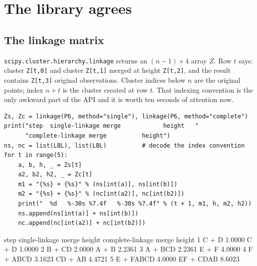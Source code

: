 \documentclass[11pt]{article}
\begin{document}
\section{The library agrees}
\label{sec:scipy}

\subsection{The linkage matrix}

\texttt{scipy.cluster.hierarchy.linkage} returns an $(n-1) \times 4$ array
$Z$. Row $t$ says: cluster \texttt{Z[t,0]} and cluster \texttt{Z[t,1]} merged
at height \texttt{Z[t,2]}, and the result contains \texttt{Z[t,3]} original
observations. Cluster indices below $n$ are the original points; index $n+t$
is the cluster created at row $t$. That indexing convention is the only
awkward part of the API and it is worth ten seconds of attention now.

\begin{lstlisting}
Zs, Zc = linkage(P6, method="single"), linkage(P6, method="complete")
print("step  single-linkage merge            height   "
      "complete-linkage merge          height")
ns, nc = list(LBL), list(LBL)          # decode the index convention
for t in range(5):
    a, b, h, _ = Zs[t]
    a2, b2, h2, _ = Zc[t]
    m1 = "{%s} + {%s}" % (ns[int(a)], ns[int(b)])
    m2 = "{%s} + {%s}" % (nc[int(a2)], nc[int(b2)])
    print("  %d   %-30s %7.4f   %-30s %7.4f" % (t + 1, m1, h, m2, h2))
    ns.append(ns[int(a)] + ns[int(b)])
    nc.append(nc[int(a2)] + nc[int(b2)])
\end{lstlisting}
\begin{codeout}
step  single-linkage merge            height   complete-linkage merge          height
  1   {C} + {D}                       1.0000   {C} + {D}                       1.0000
  2   {B} + {CD}                      2.0000   {A} + {B}                       2.2361
  3   {A} + {BCD}                     2.2361   {E} + {F}                       4.0000
  4   {F} + {ABCD}                    3.1623   {CD} + {AB}                     4.4721
  5   {E} + {FABCD}                   4.0000   {EF} + {CDAB}                   8.6023
\end{codeout}
\end{document}
